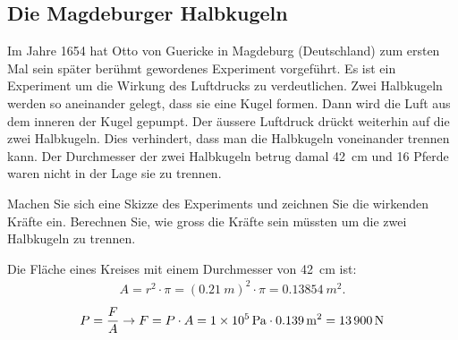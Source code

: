 \subsection*{Die Magdeburger Halbkugeln}
Im Jahre 1654 hat Otto von Guericke in Magdeburg (Deutschland) zum ersten Mal sein später berühmt gewordenes Experiment vorgeführt.
Es ist ein Experiment um die Wirkung des Luftdrucks zu verdeutlichen.
Zwei Halbkugeln werden so aneinander gelegt, dass sie eine Kugel formen.
Dann wird die Luft aus dem inneren der Kugel gepumpt. Der äussere Luftdruck drückt weiterhin auf die zwei Halbkugeln.
Dies verhindert, dass man die Halbkugeln voneinander trennen kann. Der Durchmesser der zwei Halbkugeln betrug damal \SI{42}{cm}
und 16 Pferde waren nicht in der Lage sie zu trennen.

\begin{center}
\end{center}

\begin{aufgabe}
	Machen Sie sich eine Skizze des Experiments und zeichnen Sie die wirkenden Kräfte ein.
Berechnen Sie, wie gross die Kräfte sein müssten um die zwei Halbkugeln zu trennen.

\begin{loesung}
	Die Fläche eines Kreises mit einem Durchmesser von \SI{42}{cm} ist:
	\begin{eqnarray*}
		A=r^2\cdot \pi=(\SI{0.21}{m})^2\cdot\pi=\SI{0.13854}{m^2}.
	\end{eqnarray*}
	\begin{eqnarray*}
		P=\frac{F}{A} \to F=P\cdot A=\SI{1E5}{Pa}\cdot\SI{0.139}{m^2}=\SI{13900}{N}
	\end{eqnarray*}
\end{loesung}
\end{aufgabe}

